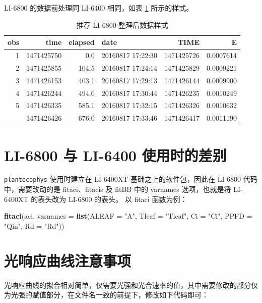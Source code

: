 \documentclass[]{krantz}
\makeatletter
\newenvironment{Shaded}{\begin{snugshade}}{\end{snugshade}}
\newcommand{\KeywordTok}[1]{\textcolor[rgb]{0.13,0.29,0.53}{\textbf{#1}}}
\newcommand{\DataTypeTok}[1]{\textcolor[rgb]{0.13,0.29,0.53}{#1}}
\newcommand{\StringTok}[1]{\textcolor[rgb]{0.31,0.60,0.02}{#1}}
\newcommand{\NormalTok}[1]{#1}
\newenvironment{kframe}{%
\medskip{}
\setlength{\fboxsep}{.8em}
 \def\at@end@of@kframe{}%
 \ifinner\ifhmode%
  \def\at@end@of@kframe{\end{minipage}}%
  \begin{minipage}{\columnwidth}%
 \fi\fi%
 \def\FrameCommand##1{\hskip\@totalleftmargin \hskip-\fboxsep
 \colorbox{shadecolor}{##1}\hskip-\fboxsep
     \hskip-\linewidth \hskip-\@totalleftmargin \hskip\columnwidth}%
 \MakeFramed {\advance\hsize-\width
   \@totalleftmargin\z@ \linewidth\hsize
   \@setminipage}}%
 {\par\unskip\endMakeFramed%
 \at@end@of@kframe}
\renewenvironment{Shaded}{\begin{kframe}}{\end{kframe}}
\theoremstyle{definition}
\theoremstyle{definition}
\theoremstyle{definition}
\theoremstyle{remark}
\makeatother
\begin{document}
LI-6800 的数据前处理同 LI-6400 相同，如表 \ref{tab:head6800}
所示的样式。

\begin{longtable}{rrrlrr}
\caption{\label{tab:head6800}推荐 LI-6800 整理后数据样式}\\
\toprule
obs & time & elapsed & date & TIME & E\\
\midrule
1 & 1471425750 & 0.0 & 20160817 17:22:30 & 1471425726 & 0.0007614\\
2 & 1471425855 & 104.5 & 20160817 17:24:14 & 1471425829 & 0.0009221\\
3 & 1471426153 & 403.1 & 20160817 17:29:13 & 1471426144 & 0.0009900\\
4 & 1471426244 & 494.0 & 20160817 17:30:44 & 1471426235 & 0.0010249\\
5 & 1471426335 & 585.1 & 20160817 17:32:15 & 1471426326 & 0.0010632\\
\addlinespace
6 & 1471426426 & 676.0 & 20160817 17:33:46 & 1471426417 & 0.0011190\\
\bottomrule
\end{longtable}

\section{LI-6800 与 LI-6400 使用时的差别}\label{li-6800--li-6400-}

\texttt{plantecophys} 使用时建立在 LI-6400XT 基础之上的软件包，因此在
LI-6800 代码中，需要改动的是 fitaci、fitacis 及 fitBB 中的 varnames
选项，也就是将 LI-6400XT 的表头改为 LI-6800 的表头。 以 fitaci
函数为例：

\begin{Shaded}
\begin{Highlighting}[]
 \KeywordTok{fitaci}\NormalTok{(aci, }\DataTypeTok{varnames =} 
        \KeywordTok{list}\NormalTok{(}\DataTypeTok{ALEAF =} \StringTok{"A"}\NormalTok{, }\DataTypeTok{Tleaf =} \StringTok{"Tleaf"}\NormalTok{, }\DataTypeTok{Ci =} \StringTok{"Ci"}\NormalTok{, }
          \DataTypeTok{PPFD  =} \StringTok{"Qin"}\NormalTok{, }\DataTypeTok{Rd =} \StringTok{"Rd"}\NormalTok{))}
\end{Highlighting}
\end{Shaded}

\section{光响应曲线注意事项}

光响应曲线的拟合相对简单，仅需要光强和光合速率的值，其中需要修改的部分仅为光强的赋值部分，在文件名一致的前提下，修改如下代码即可：
\end{document}
